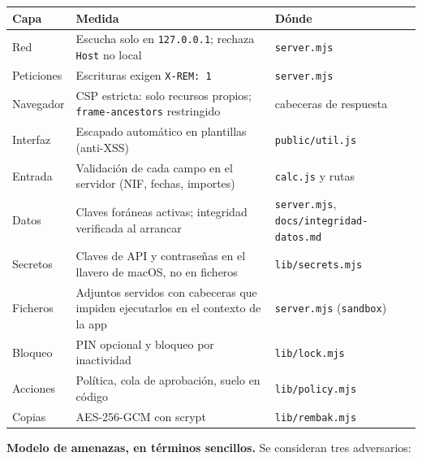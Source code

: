 {\def\LTcaptype{none} %
\begin{longtable}[]{@{}
  >{\raggedright\arraybackslash}p{}
  >{\raggedright\arraybackslash}p{}
  >{\raggedright\arraybackslash}p{}@{}}
\toprule\noalign{}
\begin{minipage}[b]{\linewidth}\raggedright
Capa
\end{minipage} & \begin{minipage}[b]{\linewidth}\raggedright
Medida
\end{minipage} & \begin{minipage}[b]{\linewidth}\raggedright
Dónde
\end{minipage} \\
\midrule\noalign{}
\endhead
\bottomrule\noalign{}
\endlastfoot
Red & Escucha solo en \texttt{127.0.0.1}; rechaza \texttt{Host} no local & \texttt{server.mjs} \\
Peticiones & Escrituras exigen \texttt{X-REM:\ 1} & \texttt{server.mjs} \\
Navegador & CSP estricta: solo recursos propios; \texttt{frame-ancestors} restringido & cabeceras de respuesta \\
Interfaz & Escapado automático en plantillas (anti-XSS) & \texttt{public/util.js} \\
Entrada & Validación de cada campo en el servidor (NIF, fechas, importes) & \texttt{calc.js} y rutas \\
Datos & Claves foráneas activas; integridad verificada al arrancar & \texttt{server.mjs}, \texttt{docs/integridad-datos.md} \\
Secretos & Claves de API y contraseñas en el llavero de macOS, no en ficheros & \texttt{lib/secrets.mjs} \\
Ficheros & Adjuntos servidos con cabeceras que impiden ejecutarlos en el contexto de la app & \texttt{server.mjs} (\texttt{sandbox}) \\
Bloqueo & PIN opcional y bloqueo por inactividad & \texttt{lib/lock.mjs} \\
Acciones & Política, cola de aprobación, suelo en código & \texttt{lib/policy.mjs} \\
Copias & AES-256-GCM con scrypt & \texttt{lib/rembak.mjs} \\
\end{longtable}
}

\textbf{Modelo de amenazas, en términos sencillos.} Se consideran tres adversarios:

